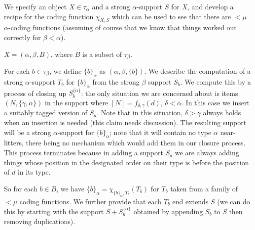 \documentclass[112pt]{article}
\begin{document}
\begin{description}
We specify an object $X\in \tau_\alpha$ and a strong $\alpha$-support $S$ for $X$, and develop a recipe for the coding function $\chi_{X,S}$ which can be used to see that there are $<\mu$ $\alpha$-coding functions (assuming of course that we know that things worked out correctly for $\beta<\alpha$).

$X = (\alpha,\beta,B)$, where $B$ is a subset of $\tau_\beta$.  

For each $b \in \tau_\beta$, we define $\{b\}_\alpha$ as $(\alpha,\beta,\{b\})$.  We describe the computation of a strong $\alpha$-support $T_b$
for $\{b\}_\alpha$ from the strong $\beta$ support $S_b$.   We compute this by a process of closing up $S_b^{\{\alpha\}}$:  the only situation we are concerned
about is items $(N,\{\gamma,\alpha\})$ in the support where $[N]=f_{\delta,\gamma}(d)$, $\delta<\alpha$.  In this case we insert a suitably
tagged version of $S_d$.  Note that in this situation, $\delta>\gamma$ always holds when an insertion is needed (this claim needs discussion).  The resulting support will be a strong $\alpha$-support for $\{b\}_\alpha$;  note that it will contain no type $\alpha$ near-litters, there being no mechanism which would add them in our closure process.  This process terminates because in adding a support $S_d$ we are always adding things whose position in the designated order on their type is before the position of $d$ in its type.

So for each $b \in B$, we have $\{b\}_\alpha = \chi_{\{b\}_\alpha,T_b}(T_b)$ for $T_b$ taken from a family of $<\mu$ coding functions.
We further provide that each $T_b$ end extends $S$ (we can do this by starting with the support $S+S_b^{\{\alpha\}}$ obtained by appending $S_b$ to $S$ then removing duplications).


\end{description}
\end{document}
